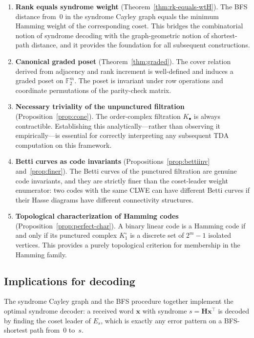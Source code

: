 \documentclass[11pt,twoside,leqno]{article}
\theoremstyle{definition}
\theoremstyle{plain}
\theoremstyle{remark}
\newcommand{\Ftwo}{\mathbb{F}_2}
\newcommand{\HH}{\mathbf{H}}
\newcommand{\xx}{\mathbf{x}}
\begin{document}
\begin{enumerate}[leftmargin=*,itemsep=3pt]
\item \textbf{Rank equals syndrome weight}
  (Theorem~\ref{thm:rk-equals-wtH}).
  The BFS distance from~$0$ in the syndrome Cayley graph equals the minimum Hamming weight
  of the corresponding coset. This bridges the combinatorial notion of syndrome decoding with
  the graph-geometric notion of shortest-path distance, and it provides the foundation for
  all subsequent constructions.

\item \textbf{Canonical graded poset}
  (Theorem~\ref{thm:graded}).
  The cover relation derived from adjacency and rank increment is well-defined and induces a
  graded poset on $\Ftwo^m$. The poset is invariant under row operations and coordinate
  permutations of the parity-check matrix.

\item \textbf{Necessary triviality of the unpunctured filtration}
  (Proposition~\ref{prop:cone}).
  The order-complex filtration $K_\bullet$ is always contractible. Establishing this
  analytically---rather than observing it empirically---is essential for correctly interpreting
  any subsequent TDA computation on this framework.

\item \textbf{Betti curves as code invariants}
  (Propositions~\ref{prop:bettiinv} and~\ref{prop:finer}).
  The Betti curves of the punctured filtration are genuine code invariants, and they are
  strictly finer than the coset-leader weight enumerator: two codes with the same CLWE can
  have different Betti curves if their Hasse diagrams have different connectivity structures.

\item \textbf{Topological characterization of Hamming codes}
  (Proposition~\ref{prop:perfect-char}).
  A binary linear code is a Hamming code if and only if its punctured complex $K_1^\circ$
  is a discrete set of $2^m-1$ isolated vertices. This provides a purely topological
  criterion for membership in the Hamming family.
\end{enumerate}

\subsection{Implications for decoding}

The syndrome Cayley graph and the BFS procedure together implement the optimal syndrome decoder:
a received word $\xx$ with syndrome $s=\HH\xx^\top$ is decoded by finding the coset leader of $E_s$,
which is exactly any error pattern on a BFS-shortest path from~$0$ to~$s$.
\end{document}
